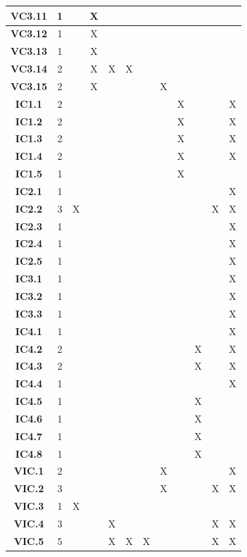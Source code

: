 \documentclass [10pt]{article}
\begin{document}
\begin{center}
\begin{tabularx} {.88\textwidth} {|c|c|c|c|c|c|c|c|c|c|c|c|}
 \textbf{VC3.11} &1& & X& & & &  & & & &    \\ \hline
 \textbf{VC3.12} &1& & X& & & &  & & & &     \\ \hline
 \textbf{VC3.13} &1& & X& & & &  & & & &     \\ \hline
 \textbf{VC3.14} &2& & X& X& X& &  & & & &     \\ \hline
 \textbf{VC3.15} &2& & X& & & &  X& & & &     \\ \hline
 \textbf{IC1.1}  &2 & & & & & & &  X  & & & X \\ \hline
 \textbf{IC1.2}  &2& && & & & &  X& &  & X  \\ \hline 
 \textbf{IC1.3}  &2& & & & & & &  X & & & X  \\ \hline 
 \textbf{IC1.4}  &2& & & & & & &  X & & & X  \\ \hline 
 \textbf{IC1.5}  &1& & & & & & &  X & & &   \\ \hline 
 \textbf{IC2.1}  &1 & & & & & & &  & & & X \\ \hline
 \textbf{IC2.2}  &3& X& & & & & &  & &X & X  \\ \hline 
 \textbf{IC2.3}  &1& & & & & & & &  & & X  \\ \hline 
 \textbf{IC2.4}  &1& & & & & & & &  & & X  \\ \hline 
 \textbf{IC2.5}  &1& & & & & & & &  & & X  \\ \hline 
 \textbf{IC3.1}  &1 & & & & & & &  & & & X \\ \hline
 \textbf{IC3.2}  &1& & & & & &  & & & & X  \\ \hline 
 \textbf{IC3.3}  &1& & & & &  & & & & & X  \\ \hline
  \textbf{IC4.1} &1& & & & &  & & & & & X  \\ \hline
 \textbf{IC4.2}  &2& & & & &  & & & X & & X  \\ \hline
 \textbf{IC4.3}  &2& & & & &  & & & X & & X  \\ \hline
 \textbf{IC4.4}  &1& & & & &  & & & & & X  \\ \hline
 \textbf{IC4.5}  &1& & & & &  & & & X & & \\  \hline
 \textbf{IC4.6}  &1& & & & &  & & & X & &   \\ \hline
 \textbf{IC4.7}  &1& & & & &  & & & X & &   \\ \hline
 \textbf{IC4.8}  &1& & & & &  & & & X & &   \\ \hline
 \textbf{VIC.1}  &2& & & & &  & X& & & & X  \\ \hline
 \textbf{VIC.2}  &3& & & &  & & X& & & X& X  \\ \hline
 \textbf{VIC.3}  &1& X& & &  & & & & & &   \\ \hline
 \textbf{VIC.4}  &3& & & X& & & & &  & X& X  \\ \hline
 \textbf{VIC.5}  &5& & & X& X& X& &  & & X& X  \\ \hline


\end{tabularx}
\end{center}
\end{document}

